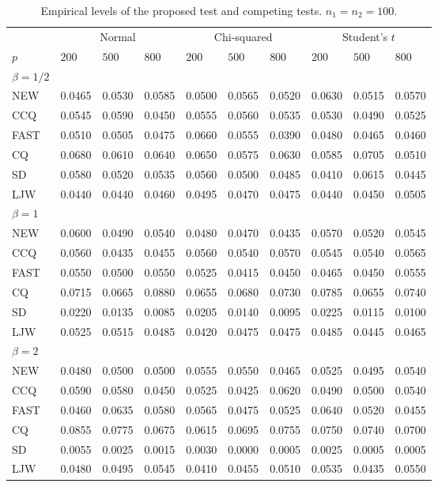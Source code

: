 \documentclass[times,sort&compress,3p]{elsarticle}
\theoremstyle{plain}
\theoremstyle{definition}
\theoremstyle{remark}
\begin{document}
\begin{table}[ht]
\caption{Empirical levels of the proposed test and competing tests. $n_1=n_2=100$.} 
\label{hahaha2}
\vspace{3mm}
\centering
\begin{tabular}{llllllllll}
\toprule
    &   \multicolumn{3}{c}{Normal} & \multicolumn{3}{c}{Chi-squared}& \multicolumn{3}{c}{Student's $t$}  \\
    \cmidrule(r){2-4}
\cmidrule(r){5-7}
\cmidrule(r){8-10}
    $p$ & $200$ &  $500$ & $800$ & $200$  & $500$ & $800$ & $200$ & $500$ & $800$ \\ 
\midrule
    $\beta=1/2$\\
NEW & 0.0465 & 0.0530 & 0.0585 & 0.0500 & 0.0565 & 0.0520 & 0.0630 & 0.0515 & 0.0570 \\ 
CCQ & 0.0545 & 0.0590 & 0.0450 & 0.0555 & 0.0560 & 0.0535 & 0.0530 & 0.0490 & 0.0525 \\ 
FAST & 0.0510 & 0.0505 & 0.0475 & 0.0660 & 0.0555 & 0.0390 & 0.0480 & 0.0465 & 0.0460 \\ 
CQ & 0.0680 & 0.0610 & 0.0640 & 0.0650 & 0.0575 & 0.0630 & 0.0585 & 0.0705 & 0.0510 \\ 
SD & 0.0580 & 0.0520 & 0.0535 & 0.0560 & 0.0500 & 0.0485 & 0.0410 & 0.0615 & 0.0445 \\ 
LJW & 0.0440 & 0.0440 & 0.0460 & 0.0495 & 0.0470 & 0.0475 & 0.0440 & 0.0450 & 0.0505 \\ 
    $\beta=1$\\
NEW & 0.0600 & 0.0490 & 0.0540 & 0.0480 & 0.0470 & 0.0435 & 0.0570 & 0.0520 & 0.0545 \\ 
CCQ & 0.0560 & 0.0435 & 0.0455 & 0.0560 & 0.0540 & 0.0570 & 0.0545 & 0.0540 & 0.0565 \\ 
FAST & 0.0550 & 0.0500 & 0.0550 & 0.0525 & 0.0415 & 0.0450 & 0.0465 & 0.0450 & 0.0555 \\ 
CQ & 0.0715 & 0.0665 & 0.0880 & 0.0655 & 0.0680 & 0.0730 & 0.0785 & 0.0655 & 0.0740 \\ 
SD & 0.0220 & 0.0135 & 0.0085 & 0.0205 & 0.0140 & 0.0095 & 0.0225 & 0.0115 & 0.0100 \\ 
LJW & 0.0525 & 0.0515 & 0.0485 & 0.0420 & 0.0475 & 0.0475 & 0.0485 & 0.0445 & 0.0465 \\ 
    $\beta=2$\\
NEW & 0.0480 & 0.0500 & 0.0500 & 0.0555 & 0.0550 & 0.0465 & 0.0525 & 0.0495 & 0.0540 \\ 
CCQ & 0.0590 & 0.0580 & 0.0450 & 0.0525 & 0.0425 & 0.0620 & 0.0490 & 0.0500 & 0.0540 \\ 
FAST & 0.0460 & 0.0635 & 0.0580 & 0.0565 & 0.0475 & 0.0525 & 0.0640 & 0.0520 & 0.0455 \\ 
CQ & 0.0855 & 0.0775 & 0.0675 & 0.0615 & 0.0695 & 0.0755 & 0.0750 & 0.0740 & 0.0700 \\ 
SD & 0.0055 & 0.0025 & 0.0015 & 0.0030 & 0.0000 & 0.0005 & 0.0025 & 0.0005 & 0.0005 \\ 
LJW & 0.0480 & 0.0495 & 0.0545 & 0.0410 & 0.0455 & 0.0510 & 0.0535 & 0.0435 & 0.0550 \\ 
\bottomrule
\end{tabular}
\end{table}
\end{document}
